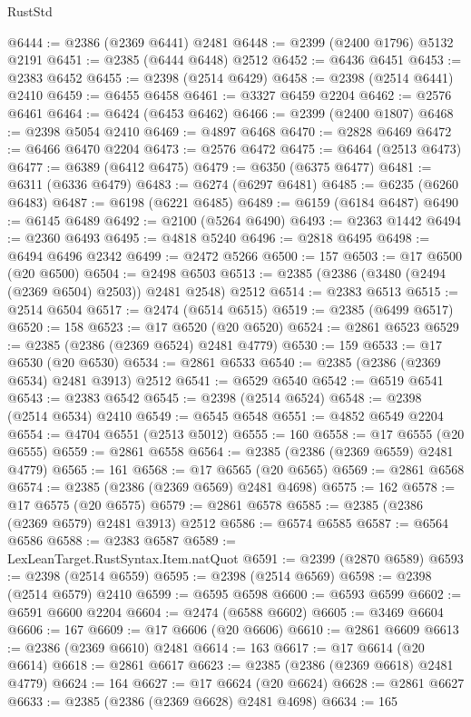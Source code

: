 \begin{lexlean}{RustStd}
\begin{coremodule}
@6444 := @2386 (@2369 @6441) @2481
@6448 := @2399 (@2400 @1796) @5132 @2191
@6451 := @2385 (@6444 @6448) @2512
@6452 := @6436 @6451
@6453 := @2383 @6452
@6455 := @2398 (@2514 @6429)
@6458 := @2398 (@2514 @6441) @2410
@6459 := @6455 @6458
@6461 := @3327 @6459 @2204
@6462 := @2576 @6461
@6464 := @6424 (@6453 @6462)
@6466 := @2399 (@2400 @1807)
@6468 := @2398 @5054 @2410
@6469 := @4897 @6468
@6470 := @2828 @6469
@6472 := @6466 @6470 @2204
@6473 := @2576 @6472
@6475 := @6464 (@2513 @6473)
@6477 := @6389 (@6412 @6475)
@6479 := @6350 (@6375 @6477)
@6481 := @6311 (@6336 @6479)
@6483 := @6274 (@6297 @6481)
@6485 := @6235 (@6260 @6483)
@6487 := @6198 (@6221 @6485)
@6489 := @6159 (@6184 @6487)
@6490 := @6145 @6489
@6492 := @2100 (@5264 @6490)
@6493 := @2363 @1442
@6494 := @2360 @6493
@6495 := @4818 @5240
@6496 := @2818 @6495
@6498 := @6494 @6496 @2342
@6499 := @2472 @5266
@6500 := 157
@6503 := @17 @6500 (@20 @6500)
@6504 := @2498 @6503
@6513 := @2385 (@2386 (@3480 (@2494 (@2369 @6504) @2503)) @2481 @2548) @2512
@6514 := @2383 @6513
@6515 := @2514 @6504
@6517 := @2474 (@6514 @6515)
@6519 := @2385 (@6499 @6517)
@6520 := 158
@6523 := @17 @6520 (@20 @6520)
@6524 := @2861 @6523
@6529 := @2385 (@2386 (@2369 @6524) @2481 @4779)
@6530 := 159
@6533 := @17 @6530 (@20 @6530)
@6534 := @2861 @6533
@6540 := @2385 (@2386 (@2369 @6534) @2481 @3913) @2512
@6541 := @6529 @6540
@6542 := @6519 @6541
@6543 := @2383 @6542
@6545 := @2398 (@2514 @6524)
@6548 := @2398 (@2514 @6534) @2410
@6549 := @6545 @6548
@6551 := @4852 @6549 @2204
@6554 := @4704 @6551 (@2513 @5012)
@6555 := 160
@6558 := @17 @6555 (@20 @6555)
@6559 := @2861 @6558
@6564 := @2385 (@2386 (@2369 @6559) @2481 @4779)
@6565 := 161
@6568 := @17 @6565 (@20 @6565)
@6569 := @2861 @6568
@6574 := @2385 (@2386 (@2369 @6569) @2481 @4698)
@6575 := 162
@6578 := @17 @6575 (@20 @6575)
@6579 := @2861 @6578
@6585 := @2385 (@2386 (@2369 @6579) @2481 @3913) @2512
@6586 := @6574 @6585
@6587 := @6564 @6586
@6588 := @2383 @6587
@6589 := LexLeanTarget.RustSyntax.Item.natQuot
@6591 := @2399 (@2870 @6589)
@6593 := @2398 (@2514 @6559)
@6595 := @2398 (@2514 @6569)
@6598 := @2398 (@2514 @6579) @2410
@6599 := @6595 @6598
@6600 := @6593 @6599
@6602 := @6591 @6600 @2204
@6604 := @2474 (@6588 @6602)
@6605 := @3469 @6604
@6606 := 167
@6609 := @17 @6606 (@20 @6606)
@6610 := @2861 @6609
@6613 := @2386 (@2369 @6610) @2481
@6614 := 163
@6617 := @17 @6614 (@20 @6614)
@6618 := @2861 @6617
@6623 := @2385 (@2386 (@2369 @6618) @2481 @4779)
@6624 := 164
@6627 := @17 @6624 (@20 @6624)
@6628 := @2861 @6627
@6633 := @2385 (@2386 (@2369 @6628) @2481 @4698)
@6634 := 165

\end{coremodule}
\end{lexlean}
